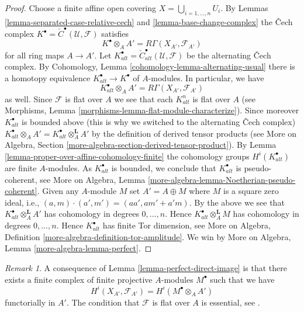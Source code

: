 \documentclass{stacks-project}
\theoremstyle{plain}
\theoremstyle{definition}
\theoremstyle{remark}
\newtheorem{remark}[subsection]{Remark}
\numberwithin{equation}{subsection}
\begin{document}
\begin{proof}
Choose a finite affine open covering $X = \bigcup_{i = 1, \ldots, n} U_i$.
By Lemmas \ref{lemma-separated-case-relative-cech} and
\ref{lemma-base-change-complex} the {\v C}ech complex
$K^\bullet = {\check C}^\bullet(\mathcal{U}, \mathcal{F})$ satisfies
$$
K^\bullet \otimes_A A' = R\Gamma(X_{A'}, \mathcal{F}_{A'})
$$
for all ring maps $A \to A'$. Let
$K_{alt}^\bullet = {\check C}_{alt}^\bullet(\mathcal{U}, \mathcal{F})$
be the alternating {\v C}ech complex. By
Cohomology, Lemma \ref{cohomology-lemma-alternating-usual}
there is a homotopy equivalence $K_{alt}^\bullet \to K^\bullet$
of $A$-modules. In particular, we have
$$
K_{alt}^\bullet \otimes_A A' = R\Gamma(X_{A'}, \mathcal{F}_{A'})
$$
as well. Since $\mathcal{F}$ is flat over $A$ we see that each $K_{alt}^n$
is flat over $A$ (see
Morphisms, Lemma \ref{morphisms-lemma-flat-module-characterize}).
Since moreover $K_{alt}^\bullet$ is bounded above (this is why we switched
to the alternating {\v C}ech complex)
$K_{alt}^\bullet \otimes_A A' = K_{alt}^\bullet \otimes_A^{\mathbf{L}} A'$
by the definition of derived tensor products (see
More on Algebra, Section \ref{more-algebra-section-derived-tensor-product}).
By
Lemma \ref{lemma-proper-over-affine-cohomology-finite}
the cohomology groups $H^i(K_{alt}^\bullet)$ are finite $A$-modules.
As $K_{alt}^\bullet$ is bounded, we conclude that $K_{alt}^\bullet$
is pseudo-coherent, see
More on Algebra, Lemma \ref{more-algebra-lemma-Noetherian-pseudo-coherent}.
Given any $A$-module $M$ set $A' = A \oplus M$ where $M$ is a square zero
ideal, i.e., $(a, m) \cdot (a', m') = (aa', am' + a'm)$. By the
above we see that $K_{alt}^\bullet \otimes_A^\mathbf{L} A'$ has cohomology
in degrees $0, \ldots, n$. Hence $K_{alt}^\bullet \otimes_A^\mathbf{L} M$
has cohomology in degrees $0, \ldots, n$. Hence $K_{alt}^\bullet$ has
finite Tor dimension, see
More on Algebra, Definition \ref{more-algebra-definition-tor-amplitude}.
We win by More on Algebra, Lemma \ref{more-algebra-lemma-perfect}.
\end{proof}

\begin{remark}
\label{remark-explain-perfect-direct-image}
A consequence of Lemma \ref{lemma-perfect-direct-image} is that there
exists a finite complex of finite projective $A$-modules $M^\bullet$ such
that we have
$$
H^i(X_{A'}, \mathcal{F}_{A'}) = H^i(M^\bullet \otimes_A A')
$$
functorially in $A'$. The condition that $\mathcal{F}$ is
flat over $A$ is essential, see \cite{Hartshorne}.
\end{remark}
\end{document}
